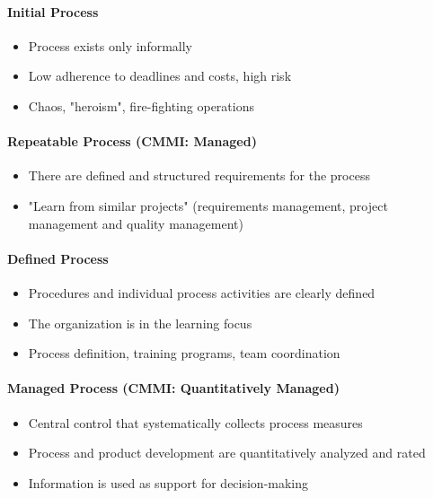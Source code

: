 \documentclass[11pt,a4paper]{article}
\begin{document}
\paragraph {Initial Process}
\begin {itemize} [noitemsep]
\item Process exists only informally
\item Low adherence to deadlines and costs, high risk
\item Chaos, "heroism", fire-fighting operations
\end {itemize}

\paragraph {Repeatable Process (CMMI: Managed)}
\begin {itemize} [noitemsep]
\item There are defined and structured requirements for the process
\item "Learn from similar projects" (requirements management, project
  management and quality management)
\end {itemize}

\paragraph {Defined Process}
\begin {itemize} [noitemsep]
\item Procedures and individual process activities are clearly defined
\item The organization is in the learning focus
\item Process definition, training programs, team coordination
\end {itemize}

\paragraph {Managed Process (CMMI: Quantitatively Managed)}
\begin {itemize} [noitemsep]
\item Central control that systematically collects process measures
\item Process and product development are quantitatively analyzed and rated
\item Information is used as support for decision-making 
\end {itemize}
\end{document}
